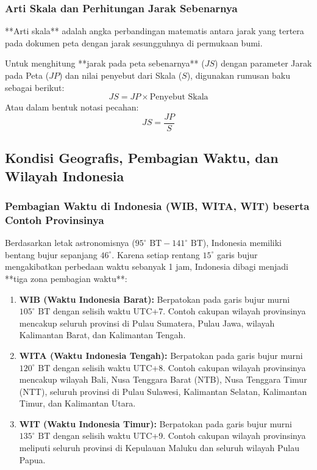 \documentclass[12pt, a4paper]{article}
\begin{document}
\subsubsection{Arti Skala dan Perhitungan Jarak Sebenarnya}
**Arti skala** adalah angka perbandingan matematis antara jarak yang tertera pada dokumen peta dengan jarak sesungguhnya di permukaan bumi. 

Untuk menghitung **jarak pada peta sebenarnya** ($JS$) dengan parameter Jarak pada Peta ($JP$) dan nilai penyebut dari Skala ($S$), digunakan rumusan baku sebagai berikut:
$$JS = JP \times \text{Penyebut Skala}$$
Atau dalam bentuk notasi pecahan:
$$JS = \frac{JP}{S}$$

\subsection{Kondisi Geografis, Pembagian Waktu, dan Wilayah Indonesia}

\subsubsection{Pembagian Waktu di Indonesia (WIB, WITA, WIT) beserta Contoh Provinsinya}
Berdasarkan letak astronomisnya ($95^\circ \text{ BT} - 141^\circ \text{ BT}$), Indonesia memiliki bentang bujur sepanjang $46^\circ$. Karena setiap rentang $15^\circ$ garis bujur mengakibatkan perbedaan waktu sebanyak 1 jam, Indonesia dibagi menjadi **tiga zona pembagian waktu**:
\begin{enumerate}
    \item \textbf{WIB (Waktu Indonesia Barat):} Berpatokan pada garis bujur murni $105^\circ \text{ BT}$ dengan selisih waktu UTC+7. Contoh cakupan wilayah provinsinya mencakup seluruh provinsi di Pulau Sumatera, Pulau Jawa, wilayah Kalimantan Barat, dan Kalimantan Tengah.
    \item \textbf{WITA (Waktu Indonesia Tengah):} Berpatokan pada garis bujur murni $120^\circ \text{ BT}$ dengan selisih waktu UTC+8. Contoh cakupan wilayah provinsinya mencakup wilayah Bali, Nusa Tenggara Barat (NTB), Nusa Tenggara Timur (NTT), seluruh provinsi di Pulau Sulawesi, Kalimantan Selatan, Kalimantan Timur, dan Kalimantan Utara.
    \item \textbf{WIT (Waktu Indonesia Timur):} Berpatokan pada garis bujur murni $135^\circ \text{ BT}$ dengan selisih waktu UTC+9. Contoh cakupan wilayah provinsinya meliputi seluruh provinsi di Kepulauan Maluku dan seluruh wilayah Pulau Papua.
\end{enumerate}
\end{document}
